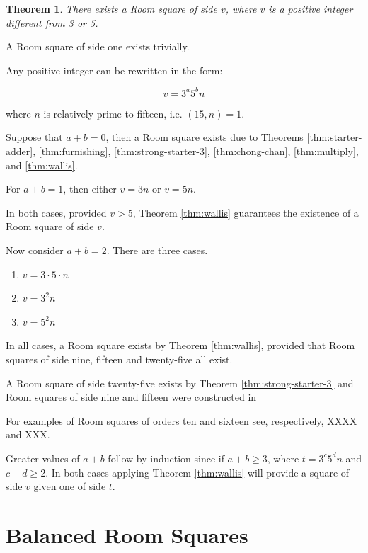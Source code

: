 \documentclass[11pt, a4paper]{book}\usepackage[]{graphicx}\usepackage[]{xcolor}
\newcounter{example}
\newtheorem{theorem}{Theorem}
\begin{document}
\begin{theorem}
There exists a Room square of side $v$, where $v$
is a positive integer different from 3 or 5.
\end{theorem}

A Room square of side one exists trivially.

Any positive integer can be rewritten in the form:

\begin{equation}
v = 3^{a}5^{b}n
\end{equation}

where $n$ is relatively prime to fifteen, i.e.
$(15, n) = 1$.

Suppose that $a + b = 0$, then a Room square exists
due to Theorems
\ref{thm:starter-adder},
\ref{thm:furnishing},
\ref{thm:strong-starter-3},
\ref{thm:chong-chan},
\ref{thm:multiply},
and
\ref{thm:wallis}.

For $a + b = 1$, then either $v = 3n$ or $v = 5n$.

In both cases, provided $v > 5$, Theorem \ref{thm:wallis} guarantees the
existence of a Room square of side $v$.

Now consider $a + b = 2$. There are three cases.

\begin{enumerate}
  \item{$v = 3\cdot 5\cdot n$}
  \item{$v = 3^{2}n$}
  \item{$v = 5^{2}n$}
\end{enumerate}

In all cases, a Room square exists by Theorem \ref{thm:wallis}, provided
that Room squares of side nine, fifteen and twenty-five all exist.

A Room square of side twenty-five exists by
Theorem \ref{thm:strong-starter-3}
and Room squares of side nine
and fifteen were constructed in
\cite{mullinFurnishingRoomSquares1969}

For examples of Room squares of orders ten and sixteen see,
respectively, XXXX and XXX.

Greater values of $a + b$ follow by induction since if
$a + b \geq 3$, where $t = 3^{c}5^{d}n$ and
$c + d \geq 2$. In both cases applying Theorem \ref{thm:wallis} will
provide a square of side $v$ given one of side $t$.

      

\chapter{Balanced Room Squares}
\end{document}
